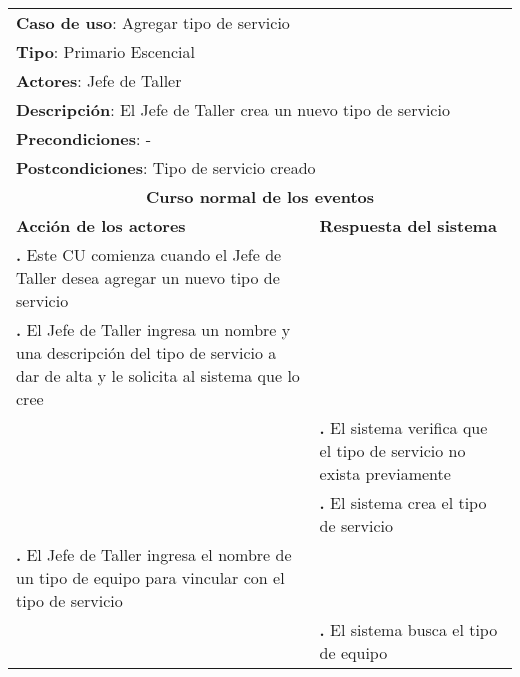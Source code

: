 \documentclass[12pt]{extarticle}
\begin{document}
    \newcommand\inc{\stepcounter{step}\textbf{\thestep. }}
    \newcommand\resetinc{\setcounter{step}{0}}
    \newcommand\raya{\noindent\rule{169mm}{0.8mm}\\}


	\begin{longtable}{ |p{8cm}|p{8cm}| }
		\hline
		\multicolumn{2}{|p{16cm}|}{\textbf{Caso de uso}: Agregar tipo de servicio}\\
		\multicolumn{2}{|p{16cm}|}{\textbf{Tipo}: Primario Escencial}\\
		\multicolumn{2}{|p{16cm}|}{\textbf{Actores}: Jefe de Taller}\\
		\multicolumn{2}{|p{16cm}|}{\textbf{Descripción}: El Jefe de Taller crea un nuevo tipo de servicio}\\
		\multicolumn{2}{|p{16cm}|}{\textbf{Precondiciones}: -}\\
		\multicolumn{2}{|p{16cm}|}{\textbf{Postcondiciones}: Tipo de servicio creado}\\
		\hline
		\multicolumn{2}{|c|}{\textbf{Curso normal de los eventos}}\\
		\hline
		\textbf{Acción de los actores} & \textbf{Respuesta del sistema}\\
		\hline
			\inc Este CU comienza cuando el Jefe de Taller desea agregar un nuevo tipo de servicio & \\
			\hline
            \inc  El Jefe de Taller ingresa un nombre y una descripción del tipo de servicio a dar de alta y le solicita al sistema que lo cree & \\
			\hline
            & \inc El sistema verifica que el tipo de servicio no exista previamente \\
			\hline
			& \inc El sistema crea el tipo de servicio \\
			\hline
			\inc El Jefe de Taller ingresa el nombre de un tipo de equipo para vincular con el tipo de servicio & \\
			\hline
			& \inc El sistema busca el tipo de equipo \\
			\hline

\end{longtable}
\end{document}
